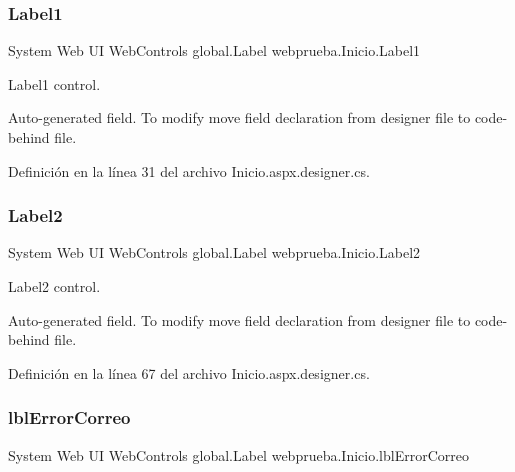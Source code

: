\mbox{\label{classwebprueba_1_1_inicio_a58d92a2b20d6ea0170c271e7bb775b39}} 
\subsubsection{\texorpdfstring{Label1}{Label1}}
{\footnotesize\ttfamily System Web UI Web\+Controls global.\+Label webprueba.\+Inicio.\+Label1\hspace{0.3cm}{\ttfamily [protected]}}



Label1 control. 

Auto-\/generated field. To modify move field declaration from designer file to code-\/behind file. 

Definición en la línea 31 del archivo Inicio.\+aspx.\+designer.\+cs.

\mbox{\label{classwebprueba_1_1_inicio_aa2261abf2e8043070afc5685f35ce672}} 
\subsubsection{\texorpdfstring{Label2}{Label2}}
{\footnotesize\ttfamily System Web UI Web\+Controls global.\+Label webprueba.\+Inicio.\+Label2\hspace{0.3cm}{\ttfamily [protected]}}



Label2 control. 

Auto-\/generated field. To modify move field declaration from designer file to code-\/behind file. 

Definición en la línea 67 del archivo Inicio.\+aspx.\+designer.\+cs.

\mbox{\label{classwebprueba_1_1_inicio_af0c102659b4bcc75bd2c07268c58063a}} 
\subsubsection{\texorpdfstring{lblErrorCorreo}{lblErrorCorreo}}
{\footnotesize\ttfamily System Web UI Web\+Controls global.\+Label webprueba.\+Inicio.\+lbl\+Error\+Correo\hspace{0.3cm}{\ttfamily [protected]}}



